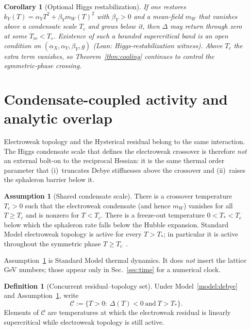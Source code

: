 \documentclass[11pt]{article}
\newtheorem{corollary}[theorem]{Corollary}
\theoremstyle{definition}
\newtheorem{definition}[theorem]{Definition}
\newtheorem{assumption}[theorem]{Assumption}
\theoremstyle{remark}
\newcommand{\Td}{T_{\diamond}}
\begin{document}
\begin{corollary}[Optional Higgs restabilization]
\label{cor:restabilize}
If one restores $k_Y(T)=\alpha_Y T^2+\beta_Y m_W(T)^2$ with $\beta_Y>0$ and a
mean-field $m_W$ that vanishes above a condensate scale $T_c$ and grows below it,
then $\Delta$ may return through zero at some $T_{\mathrm{re}}<\Td$.
Existence of such a bounded supercritical band is an open condition on
$(\alpha_X,\alpha_Y,\beta_Y,g)$ (Lean: Higgs-restabilization witness).
Above $T_c$ the extra term vanishes, so Theorem~\ref{thm:cooling} continues to
control the symmetric-phase crossing.
\end{corollary}

\section{Condensate-coupled activity and analytic overlap}
\label{sec:window}
Electroweak topology and the Hysterical residual belong to the same interaction.
The Higgs condensate scale that defines the electroweak crossover is therefore
\emph{not} an external bolt-on to the reciprocal Hessian: it is the same thermal
order parameter that (i)~truncates Debye stiffnesses above the crossover and
(ii)~raises the sphaleron barrier below it.

\begin{assumption}[Shared condensate scale]
\label{ass:condensate}
There is a crossover temperature $T_c>0$ such that the electroweak condensate
(and hence $m_W$) vanishes for all $T\ge T_c$ and is nonzero for $T<T_c$.
There is a freeze-out temperature $0<T_*<T_c$ below which the sphaleron rate
falls below the Hubble expansion.
Standard Model electroweak topology is active for every $T>T_*$; in particular
it is active throughout the symmetric phase $T\ge T_c$~\cite{DOnofrio2014}.
\end{assumption}

Assumption~\ref{ass:condensate} is Standard Model thermal dynamics.
It does \emph{not} insert the lattice GeV numbers; those appear only in
Sec.~\ref{sec:time} for a numerical clock.

\begin{definition}[Concurrent residual--topology set]
\label{def:concurrent}
Under Model~\ref{model:debye} and Assumption~\ref{ass:condensate}, write
\begin{equation}
\label{eq:concurrent}
\mathcal C:=\bigl\{T>0:\ \Delta(T)<0\ \text{and}\ T>T_*\bigr\}.
\end{equation}
Elements of $\mathcal C$ are temperatures at which the electroweak residual is
linearly supercritical while electroweak topology is still active.
\end{definition}
\end{document}
